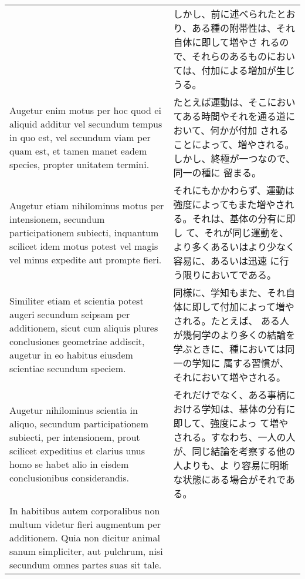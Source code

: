 \documentclass[10pt]{jsarticle} %
\begin{document}
\begin{longtable}{p{21em}p{21em}}
&

しかし、前に述べられたとおり、ある種の附帯性は、それ自体に即して増やさ
 れるので、それらのあるものにおいては、付加による増加が生じうる。


\\


Augetur enim motus per hoc quod ei aliquid additur vel
secundum tempus in quo est, vel secundum viam per quam est, et tamen
manet eadem species, propter unitatem termini. 


&

たとえば運動は、そこにおいてある時間やそれを通る道において、何かが付加
されることによって、増やされる。しかし、終極が一つなので、同一の種に
留まる。

\\

Augetur etiam
nihilominus motus per intensionem, secundum participationem subiecti,
inquantum scilicet idem motus potest vel magis vel minus expedite aut
prompte fieri. 


&

それにもかかわらず、運動は強度によってもまた増やされる。それは、基体の分有に即し
 て、それが同じ運動を、より多くあるいはより少なく容易に、あるいは迅速
 に行う限りにおいてである。


\\

Similiter etiam et scientia potest augeri secundum
seipsam per additionem, sicut cum aliquis plures conclusiones
geometriae addiscit, augetur in eo habitus eiusdem scientiae secundum
speciem. 


&

同様に、学知もまた、それ自体に即して付加によって増やされる。たとえば、
ある人が幾何学のより多くの結論を学ぶときに、種においては同一の学知に
属する習慣が、それにおいて増やされる。

\\

Augetur nihilominus scientia in aliquo, secundum
participationem subiecti, per intensionem, prout scilicet expeditius
et clarius unus homo se habet alio in eisdem conclusionibus
considerandis. 


&

それだけでなく、ある事柄における学知は、基体の分有に即して、強度によっ
て増やされる。すなわち、一人の人が、同じ結論を考察する他の人よりも、よ
り容易に明晰な状態にある場合がそれである。


\\


In habitibus autem corporalibus non multum videtur
fieri augmentum per additionem. Quia non dicitur animal sanum
simpliciter, aut pulchrum, nisi secundum omnes partes suas sit
tale. 



\end{longtable}
\end{document}
